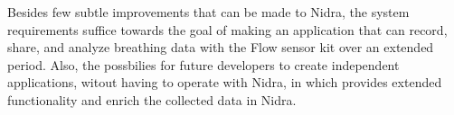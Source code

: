 Besides few subtle improvements that can be made to Nidra, the system requirements suffice towards the goal of making an application that can record, share, and analyze breathing data with the Flow sensor kit over an extended period. Also, the possbilies for future developers to create independent applications, witout having to operate with Nidra, in which provides extended functionality and enrich the collected data in Nidra. 